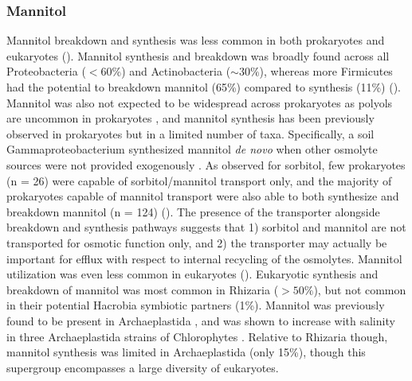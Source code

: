 \documentclass[utf8]{frontiersSCNS} %
\begin{document}
\subsubsection*{Mannitol}
Mannitol breakdown and synthesis was less common in both prokaryotes and eukaryotes (). Mannitol synthesis and breakdown was broadly found across all Proteobacteria ($< 60\%$) and Actinobacteria ($\sim 30\%$), whereas more Firmicutes had the potential to breakdown mannitol (65\%) compared to synthesis (11\%) (). Mannitol was also not expected to be widespread across prokaryotes as polyols are uncommon in prokaryotes \citep{Empadinhas2008}, and mannitol synthesis has been previously observed in prokaryotes but in a limited number of taxa. Specifically, a soil Gammaproteobacterium synthesized mannitol \emph{de novo} when other osmolyte sources were not provided exogenously \citep{Sand2013}. As observed for sorbitol, few prokaryotes (n = 26) were capable of sorbitol/mannitol transport only, and the majority of prokaryotes capable of mannitol transport were also able to both synthesize and breakdown mannitol (n = 124) (). The presence of the transporter alongside breakdown and synthesis pathways suggests that 1) sorbitol and mannitol are not transported for osmotic function only, and 2) the transporter may actually be important for efflux with respect to internal recycling of the osmolytes. Mannitol utilization was even less common in eukaryotes (). Eukaryotic synthesis and breakdown of mannitol was most common in Rhizaria ($> 50\%$), but not common in their potential Hacrobia symbiotic partners (1\%). Mannitol was previously found to be present in Archaeplastida \citep{Kirst1989}, and was shown to increase with salinity in three Archaeplastida strains of Chlorophytes \citep{Dickson1987.2}. Relative to Rhizaria though, mannitol synthesis was limited in Archaeplastida (only 15\%), though this supergroup encompasses a large diversity of eukaryotes.
\end{document}
